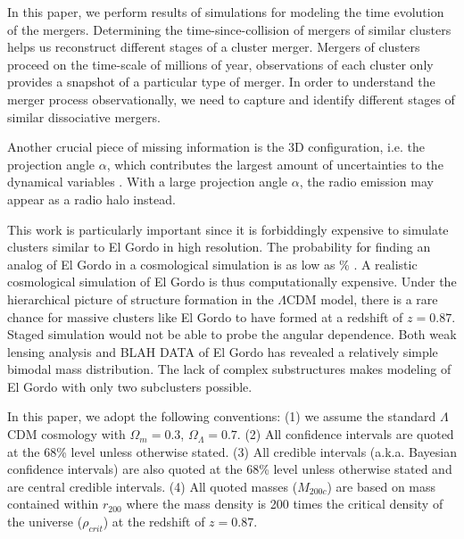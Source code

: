 In this paper, we perform results of simulations for modeling the time
evolution of the mergers. 
Determining the time-since-collision of mergers of similar clusters helps
us reconstruct different stages of a cluster merger.
Mergers of clusters proceed on the time-scale of millions of year,
observations of each cluster only provides a snapshot of a particular type
of merger. In order to understand the merger process observationally, 
we need to capture
and identify different stages of similar dissociative mergers. \par 

Another crucial piece of missing information is the 3D
configuration, i.e. the projection angle $\alpha$, which contributes the
largest amount of uncertainties to the dynamical variables \citep{D13}.
With a large projection angle $\alpha$, the radio emission may appear as a
radio halo instead.  \citep{S13}\par 
This work is particularly important since it is forbiddingly
expensive to simulate clusters similar to El Gordo in high resolution. 
The probability for finding an analog of El Gordo in a cosmological
simulation is as low as \% . A realistic cosmological simulation of
El Gordo is thus computationally expensive. Under the hierarchical picture
of structure formation in the $\Lambda$CDM model, there is a rare
chance for massive clusters like El Gordo to have formed at a redshift of
$z = 0.87$.  Staged simulation would not be able to probe the angular
dependence. 
Both weak lensing analysis and BLAH DATA of El Gordo \citep{Jee13} has revealed a
relatively simple bimodal mass distribution.  The lack of complex
substructures makes modeling of El Gordo with only two subclusters possible.

\par

In this paper, we adopt the following conventions: (1) we
assume the standard $\Lambda$CDM cosmology with $\Omega_{m} = 0.3$, $\Omega_{\Lambda} = 0.7$. (2) All confidence intervals are quoted at the 68\% level unless otherwise stated. 
(3) All credible intervals (a.k.a. Bayesian confidence intervals) are also
quoted at the 68\% level unless otherwise stated and are central credible
intervals. (4) All quoted masses ($M_{200c}$) are based on mass contained
within $r_{200}$ where the mass density is 200 times the critical density
of the universe ($\rho_{crit}$) at the redshift of $z = 0.87$. 

